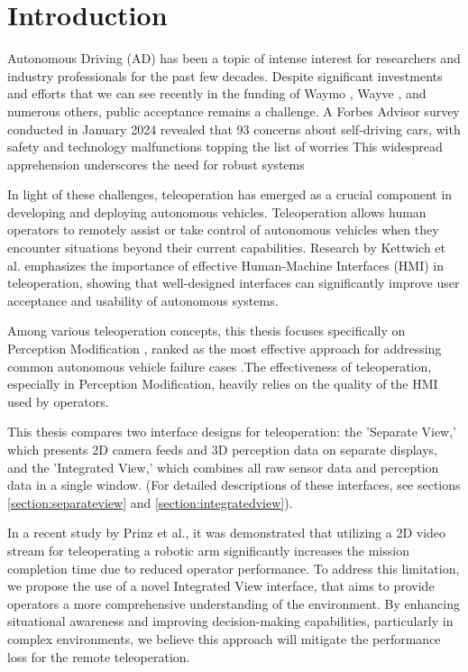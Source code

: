 
\chapter{Introduction}\label{chapter:introduction}

Autonomous Driving (AD) has been a topic of intense interest for researchers and
industry professionals for the past few decades. Despite significant investments and
efforts that we can see recently in the funding of Waymo \cite{waymo2024funding}, Wayve \cite{wayve2024funding},
and numerous others, public acceptance remains a challenge. A Forbes Advisor
survey \cite{forbes2024} conducted in January 2024 revealed that 93%
concerns about self-driving cars, with safety and technology malfunctions topping the
list of worries
This widespread apprehension underscores the need for robust systems

In light of these challenges, teleoperation has emerged as a crucial component
in developing and deploying autonomous vehicles. Teleoperation allows
human operators to remotely assist or take control of autonomous vehicles when they
encounter situations beyond their current capabilities. Research by Kettwich et al. \cite{Kettwich}
emphasizes the importance of effective Human-Machine Interfaces (HMI) in
teleoperation, showing that well-designed interfaces can significantly improve user
acceptance and usability of autonomous systems.

Among various teleoperation concepts, this thesis focuses specifically on Perception Modification \cite{Feiler2021ThePM},
ranked as the most effective approach for
addressing common autonomous vehicle failure cases \cite{Brecht} .The effectiveness of
teleoperation, especially in Perception Modification, heavily relies on the quality of the HMI used by operators.

This thesis compares two interface designs for teleoperation: the 'Separate View,'
which presents 2D camera feeds and 3D perception data on separate displays, and
the 'Integrated View,' which combines all raw sensor data and perception data in a single window.
(For detailed descriptions of these interfaces, see sections \ref{section:separateview} and \ref{section:integratedview}).

In a recent study by Prinz et al.\cite{vizualizationUserStudy}, it was demonstrated that utilizing a 2D video stream for teleoperating a robotic arm
significantly increases the mission completion time due to reduced operator performance. To address this limitation,
we propose the use of a novel Integrated View interface, that aims to provide operators a more comprehensive understanding of the environment.
By enhancing situational awareness and improving decision-making capabilities, particularly in complex environments, we believe this approach
will mitigate the performance loss for the remote teleoperation.

